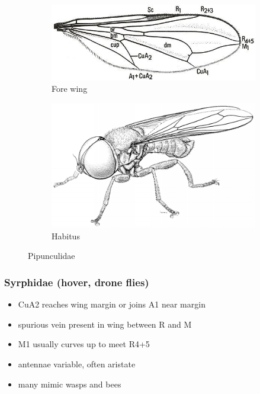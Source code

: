 \documentclass[letterpaper, 11pt]{article}
\begin{document}
\begin{figure}[ht!]
    \centering
    \begin{subfigure}[ht!]{0.45\textwidth}
        \includegraphics[width=\textwidth]{PipunculidWing}
        \caption{Fore wing \citep[][Fig. 4.50]{mcalpine1981manual}}
        \label{fig:pipunculid1}
    \end{subfigure}
    \qquad
    \begin{subfigure}[ht!]{0.42\textwidth}
        \includegraphics[width=\textwidth]{PipunculidHabitus}
        \caption{Habitus \citep[][Fig. 53.1]{mcalpine1981manualv2}}
        \label{fig:pipunculid2}
    \end{subfigure}
    \caption{Pipunculidae}\label{fig:pipunculids}
\end{figure}

\subsubsection{Syrphidae (hover, drone flies)}
\begin{itemize}
\item CuA2 reaches wing margin or joins A1 near margin
\item spurious vein present in wing between R and M
\item M1 usually curves up to meet R4+5  
\item antennae variable, often aristate
\item many mimic wasps and bees
\end{itemize}
\end{document}
